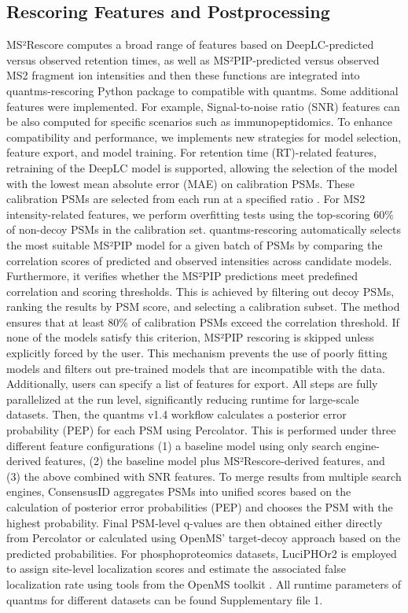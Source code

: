 \documentclass[12pt]{article}
\begin{document}
\subsection{Rescoring Features and Postprocessing}
MS²Rescore computes a broad range of features based on DeepLC-predicted versus observed retention times, as well as MS²PIP-predicted versus observed MS2 fragment ion intensities and then these functions are integrated into quantms-rescoring Python package to compatible with quantms. Some additional features were implemented. For example, Signal-to-noise ratio (SNR) features can be also computed for specific scenarios such as immunopeptidomics.
To enhance compatibility and performance, we implements new strategies for model selection, feature export, and model training. For retention time (RT)-related features, retraining of the DeepLC model is supported, allowing the selection of the model with the lowest mean absolute error (MAE) on calibration PSMs. These calibration PSMs are selected from each run at a specified ratio \cite{bouwmeester_deeplc_2025}.
For MS2 intensity-related features, we perform overfitting tests using the top-scoring 60\% of non-decoy PSMs in the calibration set. quantms-rescoring automatically selects the most suitable MS²PIP model for a given batch of PSMs by comparing the correlation scores of predicted and observed intensities across candidate models. Furthermore, it verifies whether the MS²PIP predictions meet predefined correlation and scoring thresholds. This is achieved by filtering out decoy PSMs, ranking the results by PSM score, and selecting a calibration subset. The method ensures that at least 80\% of calibration PSMs exceed the correlation threshold. If none of the models satisfy this criterion, MS²PIP rescoring is skipped unless explicitly forced by the user. This mechanism prevents the use of poorly fitting models and filters out pre-trained models that are incompatible with the data. Additionally, users can specify a list of features for export. All steps are fully parallelized at the run level, significantly reducing runtime for large-scale datasets.
Then, the quantms v1.4 workflow calculates a posterior error probability (PEP) for each PSM using Percolator. This is performed under three different feature configurations (1) a baseline model using only search engine-derived features, (2) the baseline model plus MS²Rescore-derived features, and (3) the above combined with SNR features. To merge results from multiple search engines, ConsensusID aggregates PSMs into unified scores based on the calculation of posterior error probabilities (PEP) and chooses the PSM with the highest probability. Final PSM-level q-values are then obtained either directly from Percolator or calculated using OpenMS' target-decoy approach based on the predicted probabilities. For phosphoproteomics datasets, LuciPHOr2 is employed to assign site-level localization scores and estimate the associated false localization rate using tools from the OpenMS toolkit \cite{rost_openms_2016}. All runtime parameters of quantms for different datasets can be found Supplementary file 1.
\end{document}
